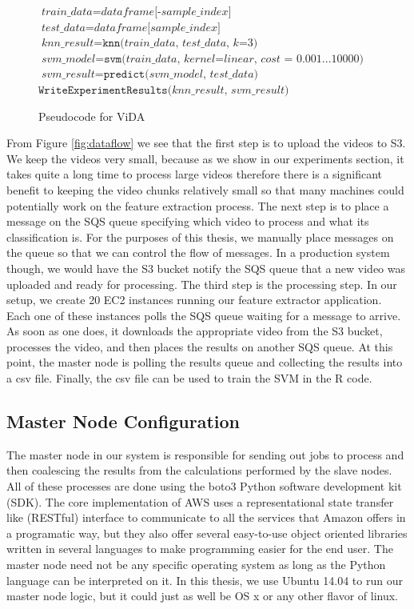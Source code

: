 \begin{figure}[h]
\begin{algorithmic}[1]
    \State $\textit{train\_data} = \textit{dataframe[-sample\_index]}$
    \State $\textit{test\_data} = \textit{dataframe[sample\_index]}$
    \State $\textit{knn\_result} = \texttt{knn(}\textit{train\_data, test\_data, k=3} \texttt{)}$
    \State $\textit{svm\_model} = \texttt{svm(}\textit{train\_data, kernel=linear, cost = 0.001...10000} \textit{)}$
    \State $\textit{svm\_result} = \texttt{predict(} \textit{svm\_model, test\_data} \texttt{)}$
  \EndFor
  \State $\texttt{WriteExperimentResults(} \textit{knn\_result, svm\_result} \texttt{)}$

\end{algorithmic}
\caption{Pseudocode for ViDA}
\label{alg:vida_pseudo_code}
\end{figure}

\FloatBarrier

From Figure \ref{fig:dataflow} we see that the first step is to upload
the videos to S3. We keep the videos very small, because as we show in our experiments
section, it takes quite a long time to process large videos therefore there is a
significant benefit to keeping the video chunks relatively small so that many
machines could potentially work on the feature extraction process. The next step
is to place a message on the SQS queue specifying which video to process and
what its classification is. For the purposes of this thesis, we manually place
messages on the queue so that we can control the flow of messages. In
a production system though, we would have the S3 bucket notify the SQS queue that
a new video was uploaded and ready for processing. The third step is the processing
step. In our setup, we create 20 EC2 instances running our feature extractor application.
Each one of these instances polls the SQS queue waiting for a message to arrive.
As soon as one does, it downloads the appropriate video from the S3 bucket,
processes the video, and then places the results on another SQS queue. At this
point, the master node is polling the results queue and collecting the results
into a csv file. Finally, the csv file can be used to train the SVM in the R
code.

\subsection{\label{subsection:master_node}Master Node Configuration}
The master node in our system is responsible for sending out jobs to process and
then coalescing the results from the calculations performed by the slave nodes.
All of these processes are done using the boto3 \cite{boto3} Python  software
development kit (SDK). The core implementation of AWS uses a  representational
state transfer like (RESTful) interface to communicate to all the services that
Amazon offers in a programatic  way, but they also offer several easy-to-use
object oriented libraries written  in several languages to make programming easier
for the end user. The master node
need not be any specific operating system as long as the Python language
can be interpreted on it. In this thesis, we use Ubuntu 14.04 to run our master
node logic, but it could just as well be OS x or any other flavor of linux.

